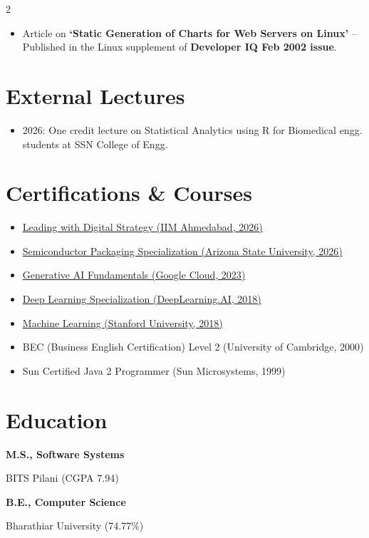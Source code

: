 \documentclass[a4paper,11pt]{article}
\newcommand\cveducation[4]{

  \normalfont\bf{#1, #2}

  \normalfont\small{#3 (#4)}
}
\begin{document}
\begin{multicols}{2}
\begin{itemize}
\item Article on \textbf{`Static Generation of Charts for Web Servers
  on Linux'} – Published in the Linux supplement of
  \textbf{Developer IQ Feb 2002 issue}.

\end{itemize}

\section*{External Lectures}

\begin{itemize}
    \item 2026: One credit lecture on Statistical Analytics using R for Biomedical engg. students at SSN College of Engg.
\end{itemize}

\section*{Certifications \& Courses}

\begin{itemize}
  
  \setlength\itemsep{-0.5em}

\item \href{https://www.coursera.org/account/accomplishments/verify/O1JNCHQ9U3FQ}{Leading with Digital Strategy (IIM Ahmedabad, 2026)}

\item \href{https://www.coursera.org/account/accomplishments/specialization/1RZ5C1R71A3C}{Semiconductor Packaging Specialization (Arizona State University, 2026)}
  
\item \href{https://partner.cloudskillsboost.google/public_profiles/c3662c2a-8b10-4480-9922-dc384a446a1d}{Generative AI Fundamentals (Google Cloud, 2023)}
  
\item
  \href{https://www.coursera.org/account/accomplishments/specialization/Y9XD9ZQ3EGG2}{Deep Learning Specialization (DeepLearning.AI, 2018)}
  
\item
  \href{https://www.coursera.org/account/accomplishments/verify/2YVCNYET6XSL}{Machine Learning (Stanford University, 2018)}

\item BEC (Business English Certification) Level 2 (University of Cambridge, 2000)
  
\item Sun Certified Java 2 Programmer (Sun Microsystems, 1999)
  
\end{itemize}

\section*{Education}

\cveducation{M.S.}{Software Systems}{BITS Pilani}{CGPA 7.94}
\cveducation{B.E.}{Computer Science}{Bharathiar University}{74.77\%}

\end{multicols}
\end{document}
